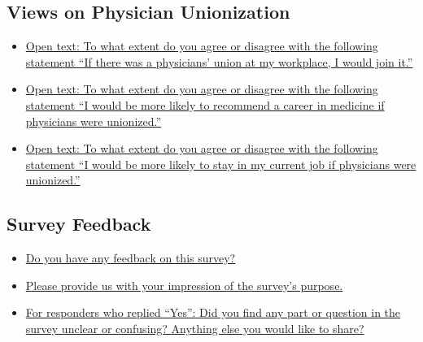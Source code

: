 \documentclass[11pt]{article}
\theoremstyle{definition}
\begin{document}
\subsection{Views on Physician Unionization}

    \begin{itemize}
        \item \href{https://www.dropbox.com/scl/fi/7l946s8rsn3pz3ay3ngr9/open_text_union_join.csv?rlkey=qoo5pf8flkn84kworsynjg04s&dl=0}{Open text: To what extent do you agree or disagree with the following statement ``If there was a physicians’ union at my workplace, I would join it.''}
        \item \href{https://www.dropbox.com/scl/fi/n2hpphm5tddg6sma346gd/open_text_union_rec_prob.csv?rlkey=oykwwwy15xkis5lvbs8k2egbh&dl=0}{Open text: To what extent do you agree or disagree with the following statement ``I would be more likely to recommend a career in medicine if physicians were unionized.''}
        \item \href{https://www.dropbox.com/scl/fi/fencs6zg509nr4s1vi2mf/open_text_union_plans.csv?rlkey=96ore8pdjvjsphxajimymd0ae&dl=0}{Open text: To what extent do you agree or disagree with the following statement ``I would be more likely to stay in my current job if physicians were unionized.''}
    \end{itemize}

    
\subsection{Survey Feedback}

    \begin{itemize}
        \item \href{https://www.dropbox.com/scl/fi/sygw2qcnhu6lxjr7p7cl8/open_text_survey_feedback.csv?rlkey=gwzrqoluii5eecgb56vm52jp5&dl=0}{Do you have any feedback on this survey?}
        \item \href{https://www.dropbox.com/scl/fi/63m9mx1qkhc6r95838idl/open_text_survey_purpose.csv?rlkey=03ila2825gpvtx0q3lhb406pd&dl=0}{Please provide us with your impression of the survey’s purpose.}
        \item \href{https://www.dropbox.com/scl/fi/ekae24vyahmeddiydrsh6/open_text_confusing_questions.csv?rlkey=fr8oiwpg6ww70cpkrt44fimnt&dl=0}{For responders who replied ``Yes'': Did you find any part or question in the survey unclear or confusing? }
        \href{https://www.dropbox.com/scl/fi/jzzi5srfjrdm8gzk779j8/open_text_add_comments.csv?rlkey=sa5sgk8u70xxtxd4n65bc3sjz&dl=0}{Anything else you would like to share?}
    \end{itemize}
\end{document}
